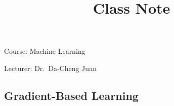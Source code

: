 \documentclass{article}
\begin{document}
\title{Class Note}
\Large{Course: Machine Learning}

\Large{Lecturer: Dr.\ Da-Cheng Juan}
%
%
%
\setcounter{section}{6}
\setcounter{subsection}{1}
\renewcommand\thefigure{\thesection.\arabic{figure}}
\subsection{Gradient-Based Learning}
\label{Ch6.2}

%
%
\end{document}
